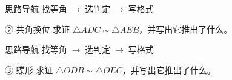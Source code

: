 \documentclass{exam-zh}
\begin{document}
\begin{eduAuxItem}{思路导航}
找等角$\;\to\;$选判定$\;\to\;$写格式\end{eduAuxItem}




\begin{eduSubQuestionItem}{② 共角换位}
求证 $\triangle ADC\sim\triangle AEB$，并写出它推出了什么。\end{eduSubQuestionItem}

\begin{eduDualExplain}
  \begin{eduExplainLeft}
  \end{eduExplainLeft}

  \begin{eduExplainRight}
      
      
      
  \end{eduExplainRight}
\end{eduDualExplain}




\begin{eduAuxItem}{思路导航}
找等角$\;\to\;$选判定$\;\to\;$写格式\end{eduAuxItem}




\begin{eduSubQuestionItem}{③ 蝶形}
求证 $\triangle ODB\sim\triangle OEC$，并写出它推出了什么。\end{eduSubQuestionItem}
\end{document}

